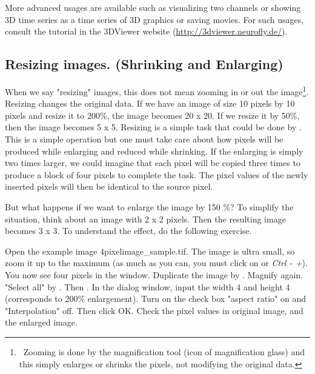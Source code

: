 More advanced usages are available such as visualizing two channels or showing 3D time series as a time series of 3D graphics or saving movies. For such usages, consult the tutorial in the 3DViewer website (\url{http://3dviewer.neurofly.de/}).  

\subsection{Resizing images. (Shrinking and Enlarging) }

When we say "resizing" images, this does not mean zooming in or out the
image\footnote{\ Zooming is done by the magnification tool (icon of
magnification glass) and this simply enlarges or shrinks the pixels, not
modifying the original data. \par }. Resizing changes the original data. If we
have an image of size 10 pixels by 10 pixels and resize it to 200\%, the image
becomes 20 x 20.
If we resize it by 50\%, then the image becomes 5 x 5. Resizing is a simple task
that could be done by . This is a simple
operation but one must take care about how pixels will be produced while
enlarging and reduced while shrinking. If the enlarging is simply two times
larger, we could imagine that each pixel will be copied three times to produce a
block of four pixels to complete the task. The pixel values of the newly
inserted pixels will then be identical to the source pixel.

But what happens if we want to enlarge the image by 150 \%? To simplify the
situation, think about an image with 2 x 2 pixels. Then the resulting image
becomes 3 x 3. To understand the effect, do the following exercise.


\begin{indentexercise}{1}
Open the example image
4pixelimage\_sample.tif. The image is ultra small, so zoom it
up to the maximum (as much as you can, you must click on or
\textit{Ctrl - +}). You now see four pixels in the window.
Duplicate the image by .
Magnify again. "Select all" by
.
Then .
In the dialog window, input the width 4 and height 4 (corresponds to
200\% enlargement). Turn on the check box "aspect
ratio" on and
"Interpolation" off. Then click
OK. Check the pixel values in original image, and the enlarged image.
\end{indentexercise}

